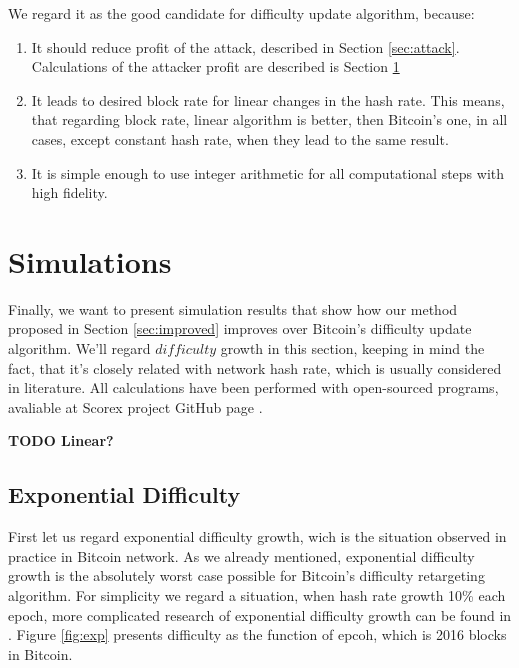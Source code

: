 \documentclass[number,preprint,review]{elsarticle}
\begin{document}
We regard it as the good candidate for difficulty update algorithm, because:
\begin{enumerate}
\item{It should reduce profit of the attack, described in Section \ref{sec:attack}.
Calculations of the attacker profit are described is Section \ref{sec:sim}}
\item{It leads to desired block rate for linear changes in the hash rate.
This means, that regarding block rate, linear algorithm is better, then Bitcoin's one, in all cases, except constant hash rate, when they lead to the same result. }
\item{It is simple enough to use integer arithmetic for all computational steps with high fidelity.}
\end{enumerate}

\section{Simulations}
\label{sec:sim}

Finally, we want to present simulation results that show how our method proposed in Section \ref{sec:improved} improves over Bitcoin’s difficulty update algorithm.
We'll regard \(difficulty\) growth in this section, keeping in mind the fact, that it's closely related with network hash rate, which is usually considered in literature.
All calculations have been performed with open-sourced programs, avaliable at Scorex project GitHub page \cite{scorex}.

\textbf{TODO Linear?}

\subsection{Exponential Difficulty}

First let us regard exponential difficulty growth, wich is the situation observed in practice in Bitcoin network.
As we already mentioned, exponential difficulty growth is the absolutely worst case possible for Bitcoin’s difficulty retargeting algorithm.
For simplicity we regard a situation, when hash rate growth 10\% each epoch, more complicated research of exponential difficulty growth can be found in \cite{kraft2015difficulty}.
Figure \ref{fig:exp} presents difficulty as the function of epcoh, which is 2016 blocks in Bitcoin.
\end{document}
